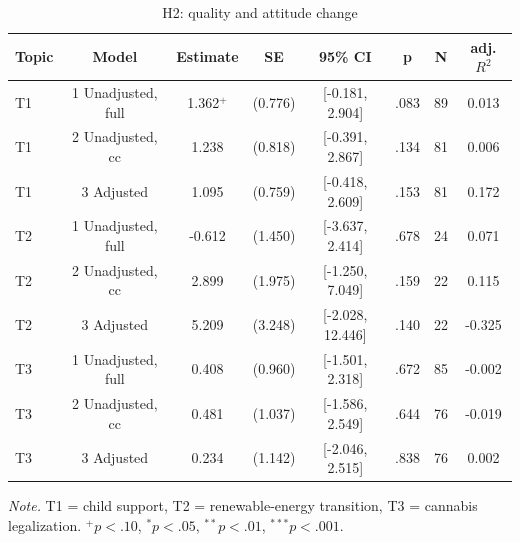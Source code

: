 \begin{table}[htbp]
\centering
\begin{threeparttable}
\caption{H2: quality and attitude change}
\label{tab:tab_h2_quality_attitude}
\begin{tabular}{lccccccc}
\toprule
  Topic & Model & Estimate & SE & 95\% CI & p & N & adj. $R^2$ \\
\midrule
  T1 & 1 Unadjusted, full & 1.362$^{+}$ & (0.776) & [-0.181, 2.904] & .083 & 89 & 0.013 \\
  T1 & 2 Unadjusted, cc & 1.238 & (0.818) & [-0.391, 2.867] & .134 & 81 & 0.006 \\
  T1 & 3 Adjusted & 1.095 & (0.759) & [-0.418, 2.609] & .153 & 81 & 0.172 \\
  T2 & 1 Unadjusted, full & -0.612 & (1.450) & [-3.637, 2.414] & .678 & 24 & 0.071 \\
  T2 & 2 Unadjusted, cc & 2.899 & (1.975) & [-1.250, 7.049] & .159 & 22 & 0.115 \\
  T2 & 3 Adjusted & 5.209 & (3.248) & [-2.028, 12.446] & .140 & 22 & -0.325 \\
  T3 & 1 Unadjusted, full & 0.408 & (0.960) & [-1.501, 2.318] & .672 & 85 & -0.002 \\
  T3 & 2 Unadjusted, cc & 0.481 & (1.037) & [-1.586, 2.549] & .644 & 76 & -0.019 \\
  T3 & 3 Adjusted & 0.234 & (1.142) & [-2.046, 2.515] & .838 & 76 & 0.002 \\
\bottomrule
\end{tabular}
\begin{tablenotes}\footnotesize\item \textit{Note.} T1 = child support, T2 = renewable-energy transition, T3 = cannabis legalization. $^{+}p<.10$, $^{*}p<.05$, $^{**}p<.01$, $^{***}p<.001$.\end{tablenotes}
\end{threeparttable}
\end{table}
